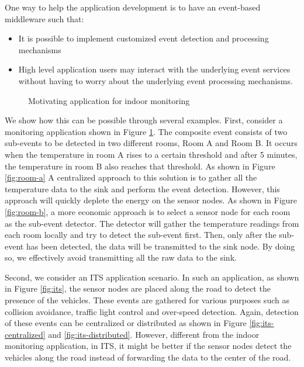 One way to help the application development is to have an event-based middleware such that:
\begin{itemize}
\item It is possible to implement customized event detection and processing mechanisms
\item High level application users may interact with the underlying event services without having to worry about the underlying event processing mechanisms.
\end{itemize}

\begin{figure}
\centering
{}
\caption{Motivating application for indoor monitoring}
\label{fig:rooms}
\end{figure}

We show how this can be possible through several examples. First, consider a monitoring application shown in Figure \ref{fig:rooms}. The composite event consists of two sub-events to be detected in two different rooms, Room A and Room B. It occurs when the temperature in room A rises to a certain threshold and after 5 minutes, the temperature in room B also reaches that threshold. As shown in Figure \ref{fig:room-a} A centralized approach to this solution is to gather all the temperature data to the sink and perform the event detection. However, this approach will quickly deplete the energy on the sensor nodes. As shown in Figure \ref{fig:room-b}, a more economic approach is to select a sensor node for each room as the sub-event detector. The detector will gather the temperature readings from each room locally and try to detect the sub-event first. Then, only after the sub-event has been detected, the data will be transmitted to the sink node. By doing so, we effectively avoid transmitting all the raw data to the sink.

Second, we consider an ITS application scenario. In such an application, as shown in Figure \ref{fig:its}, the sensor nodes are placed along the road to detect the presence of the vehicles. These events are gathered for various purposes such as collision avoidance, traffic light control and over-speed detection. Again, detection of these events can be centralized or distributed as shown in Figure \ref{fig:its-centralized} and \ref{fig:its-distributed}. However, different from the indoor monitoring application, in ITS, it might be better if the sensor nodes detect the vehicles along the road instead of forwarding the data to the center of the road. 

